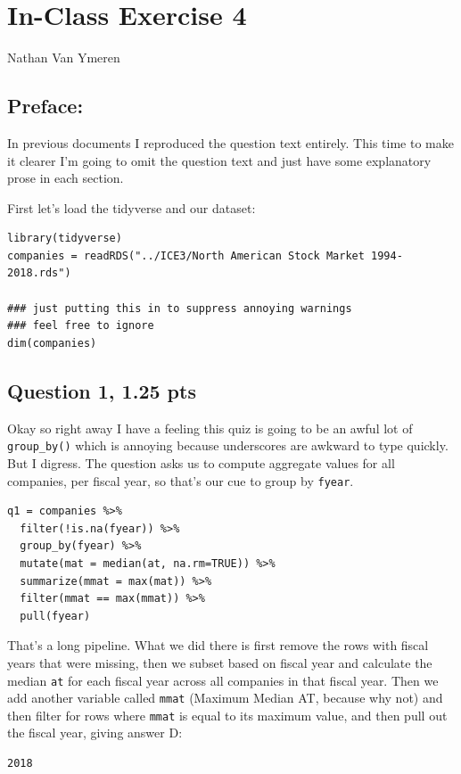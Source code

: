 \documentclass[11pt]{article}
\author{Nathan Van Ymeren}
\date{\today}
\title{}
\begin{document}
\section*{In-Class Exercise 4}
\label{sec:orgd63e8e3}
Nathan Van Ymeren
\subsection*{Preface:}
\label{sec:orgddb4012}
In previous documents I reproduced the question text entirely.  This time to make it clearer I'm going to omit the question text and just have some explanatory prose in each section.

First let's load the tidyverse and our dataset:

\begin{verbatim}
library(tidyverse)
companies = readRDS("../ICE3/North American Stock Market 1994-2018.rds")

### just putting this in to suppress annoying warnings
### feel free to ignore
dim(companies)
\end{verbatim}
\subsection*{Question 1, 1.25 pts}
\label{sec:orge8d58a1}
Okay so right away I have a feeling this quiz is going to be an awful lot of \texttt{group\_by()} which is annoying because underscores are awkward to type quickly.  But I digress.  The question asks us to compute aggregate values for all companies, per fiscal year, so that's our cue to group by \texttt{fyear}.

\begin{verbatim}
q1 = companies %>%
  filter(!is.na(fyear)) %>%
  group_by(fyear) %>%
  mutate(mat = median(at, na.rm=TRUE)) %>%
  summarize(mmat = max(mat)) %>%
  filter(mmat == max(mmat)) %>%
  pull(fyear)
\end{verbatim}

That's a long pipeline.  What we did there is first remove the rows with fiscal years that were missing, then we subset based on fiscal year and calculate the median \texttt{at} for each fiscal year across all companies in that fiscal year.  Then we add another variable called \texttt{mmat} (Maximum Median AT, because why not) and then filter for rows where \texttt{mmat} is equal to its maximum value, and then pull out the fiscal year, giving answer D:

\begin{verbatim}
2018
\end{verbatim}
\end{document}

